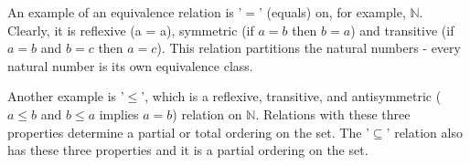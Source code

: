 \documentclass{book}
\theoremstyle{plain}%
\theoremstyle{definition}
\begin{document}
An example of an equivalence relation is '$=$' (equals) on, for example, $\mathbb{N}$. Clearly, it is reflexive (a = a), symmetric (if $a = b$ then $b = a$) and transitive (if $a = b$ and $b = c$ then $a = c$). This relation partitions the natural numbers - every natural number is its own equivalence class.

Another example is '$\leq$', which is a reflexive, transitive, and antisymmetric ($a \leq b$ and $b \leq a$ implies $a = b$) relation on $\mathbb{N}$. Relations with these three properties determine a partial or total ordering on the set. The '$\subseteq$' relation also has these three properties and it is a partial ordering on the set.



\end{document}
